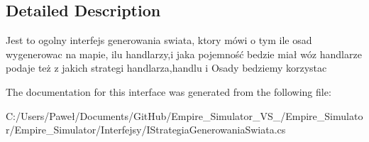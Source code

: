 \subsection{Detailed Description}
Jest to ogolny interfejs generowania swiata, ktory mówi o tym ile osad wygenerowac na mapie, ilu handlarzy,i jaka pojemność bedzie miał wóz handlarze podaje też z jakich strategi handlarza,handlu i Osady bedziemy korzystac 



The documentation for this interface was generated from the following file\+:\begin{DoxyCompactItemize}
\item 
C\+:/\+Users/\+Paweł/\+Documents/\+Git\+Hub/\+Empire\+\_\+\+Simulator\+\_\+\+V\+S\+\_/\+Empire\+\_\+\+Simulator/\+Empire\+\_\+\+Simulator/\+Interfejsy/I\+Strategia\+Generowania\+Swiata.\+cs\end{DoxyCompactItemize}
